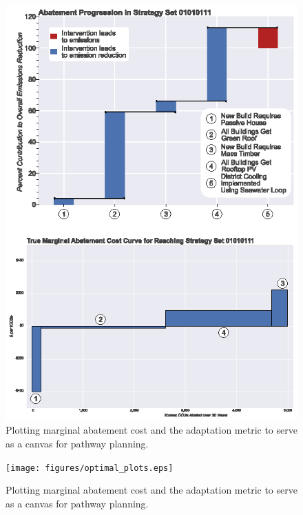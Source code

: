 \documentclass[twocolumn, a4paper,10pt]{article}
\begin{document}

\begin{figure}[t]
    \centering
    \includegraphics[scale=0.8]{figures/true_macc_DH_waterfall_comb.eps}
    \caption{Plotting marginal abatement cost and the adaptation metric to serve as a canvas for pathway planning.}
    \label{fig:MACC_true_DH}
\end{figure}


\begin{figure}[hbpt]
    \centering
    \texttt{[image: figures/optimal\_plots.eps]}
    \caption{Plotting marginal abatement cost and the adaptation metric to serve as a canvas for pathway planning.}
    \label{fig:pareto_plot}
\end{figure}
\end{document}
